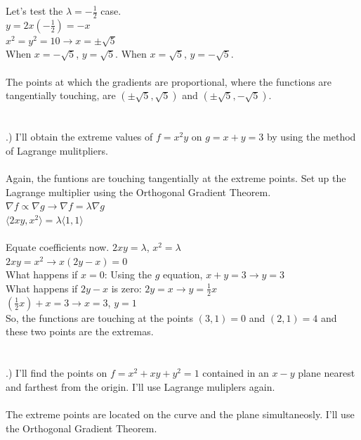 \documentclass[12pt]{article}
\begin{document}
\noindent Let's test the $\lambda = -\frac{1}{2}$ case.\\
\noindent $y = 2x(-\frac{1}{2}) = -x$\\
\noindent $x^{2} = y^{2} = 10 \rightarrow x = \pm\sqrt{5}$\\
\noindent When $x = -\sqrt{5}$, $y = \sqrt{5}$. When $x = \sqrt{5}$, $y = -\sqrt{5}$.\\\\
\noindent The points at which the gradients are proportional, where the functions are tangentially touching,
 are $(\pm \sqrt{5}, \sqrt{5})$ and $(\pm \sqrt{5}, -\sqrt{5})$.\\\\\\

.) I'll obtain the extreme values of $f = x^{2}y$ on $g = x+y=3$ by using the method of Lagrange mulitpliers.\\\\
\noindent Again, the funtions are touching tangentially at the extreme points. Set up the Lagrange multiplier using the Orthogonal Gradient Theorem. 
\noindent $\nabla f \propto \nabla g \rightarrow \nabla f = \lambda \nabla g$\\
\noindent $ \langle 2xy,x^{2}\rangle = \lambda \langle 1, 1\rangle$\\\\
\noindent Equate coefficients now. $2xy = \lambda$, \hspace{10pt} $x^{2} = \lambda$\\
\noindent $2xy = x^{2} \rightarrow x(2y -x) = 0$\\
\noindent What happens if $x = 0$:
\noindent Using the $g$ equation, $x + y = 3 \rightarrow y = 3$\\
\noindent What happens if $2y -x$ is zero:
\noindent $2y = x \rightarrow y = \frac{1}{2}x$\\
\noindent $(\frac{1}{2}x) + x = 3 \rightarrow x = 3$, $y = 1$\\
\noindent So, the functions are touching at the points $(3, 1) = 0$ and $(2, 1) = 4$ and these two points are the extremas. \\\\\\
.) I'll find the points on $f = x^{2}+xy+y^{2} = 1$ contained in an $x-y$ plane nearest and farthest from the origin. I'll use Lagrange muliplers again.\\\\
\noindent The extreme points are located on the curve and the plane simultaneosly. I'll use the Orthogonal Gradient Theorem.\\
\end{document}
